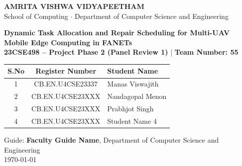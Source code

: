 \documentclass[aspectratio=169, 11pt]{beamer}
\begin{document}
\begin{frame}

    \centering
    \vspace{0.1cm}
    {\large \textbf{\textcolor{amritaMaroon}{AMRITA VISHWA VIDYAPEETHAM}}} \\
    {\scriptsize School of Computing \quad $\cdot$ \quad Department of Computer Science and Engineering} \\
    \vspace{0.25cm}
    
    {\Large \textbf{\textcolor{amritaMaroon}{Dynamic Task Allocation and Repair Scheduling for Multi-UAV Mobile Edge Computing in FANETs}}} \\
    \vspace{0.1cm}
    {\footnotesize \textbf{23CSE498 -- Project Phase 2 (Panel Review 1)} \quad | \quad \textbf{Team Number: 55}} \\ 
    \vspace{0.2cm}

    \begin{table}
        \centering
        \footnotesize 
        \renewcommand{\arraystretch}{1.08}
        \begin{tabular}{|c|c|l|}
            \hline
            \textbf{S.No} & \textbf{Register Number} & \textbf{Student Name} \\
            \hline
            1 & CB.EN.U4CSE23337 & Manas Viswajith \\
            \hline
            2 & CB.EN.U4CSE23XXX & Nandagopal Menon \\
            \hline
            3 & CB.EN.U4CSE23XXX & Prabhjot Singh \\
            \hline
            4 & CB.EN.U4CSE23XXX & Student Name 4 \\
            \hline
        \end{tabular}
    \end{table}
    \vspace{0.15cm}
    
    {\footnotesize Guide: \textbf{Faculty Guide Name}, Department of Computer Science and Engineering} \\
    \vspace{0.08cm}
    {\scriptsize \today}
\end{frame}
\end{document}
